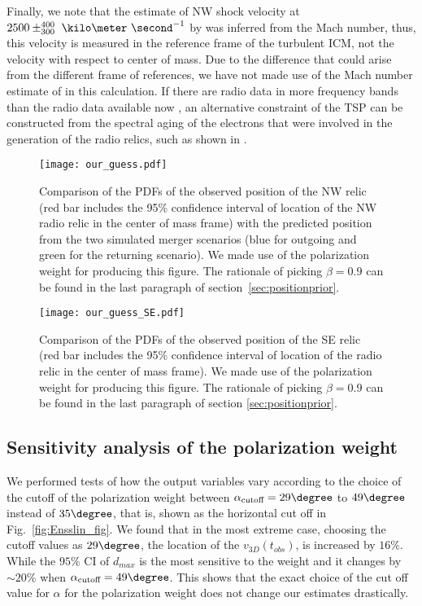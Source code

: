 \par 
Finally, we note that the estimate of NW shock velocity at $2500
\pm^{400}_{300}~\kilo\meter~\second^{-1}$ by \cite{L13} was inferred from
the Mach number, thus, this velocity is measured in the reference frame of
the turbulent ICM, not the velocity with respect to center of
mass. Due to the difference that could arise from the different frame of
references, we have not made use of the Mach number estimate of \cite{L13} in this
calculation. If there are radio data in more frequency bands than
the radio data available now \citep{L13}, an alternative constraint of the
TSP can be constructed from the spectral aging of the electrons that were involved in the generation of the
radio relics, such as shown in \citet{Stroe14}. \par
\begin{figure}
	\texttt{[image: our\_guess.pdf]}
	\caption{Comparison of the PDFs of the observed position of the NW relic (red bar
		includes the 95\% confidence interval of location of the NW radio relic in the center of mass frame) with the predicted position from the two simulated merger
		scenarios (blue for outgoing and green for the returning scenario).
	We made use of the polarization weight for producing this figure.
	The
rationale of picking $\beta = 0.9$ can be found in the last paragraph of
section~\ref{sec:positionprior}.} 
	\label{fig:our_guessed_scenario}
\end{figure}
\begin{figure}
	\texttt{[image: our\_guess\_SE.pdf]}
	\caption{Comparison of the PDFs of the observed position of the SE relic (red bar
	includes the 95\% confidence interval of location of the radio relic in
the center of mass frame). We made use of the polarization weight for
producing this figure. The
rationale of picking $\beta = 0.9$ can be found in the last paragraph of
section \ref{sec:positionprior}. 
}
	\label{fig:our_guessed_scenario1}
\end{figure}
\subsection{Sensitivity analysis of the polarization weight}
\label{sec:sensitivityTests}
We performed tests of how the output variables vary according to the
choice of the cutoff of the polarization weight between
$\alpha_{\text{cutoff}} =
29 \degree$ to $49\degree$ instead of $35 \degree$, that is, shown as the
horizontal cut off in Fig.~\ref{fig:Ensslin_fig}.
We found that in the most extreme case, choosing the cutoff values as $29
\degree$, the location of the $v_{3D}(t_{obs})$, is
increased by $16 \%$. While the $95\%$ CI of $d_{max}$ is
the most sensitive to the weight and it changes by
$\sim20 \%$ when $\alpha_{\text{cutoff}} = 49 \degree$. 
This shows that the exact choice of the cut off value for $\alpha$ for the
polarization weight does not change our estimates drastically.


